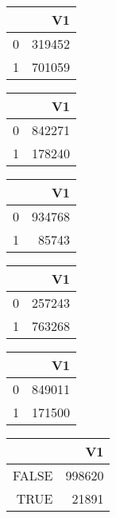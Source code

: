 \bigskip\bigskip
\centering
\begin{tabular}{rr}
  \hline
 & V1 \\ 
  \hline
0 & 319452 \\ 
  1 & 701059 \\ 
   \hline
\end{tabular}

\bigskip\bigskip
\centering
\begin{tabular}{rr}
  \hline
 & V1 \\ 
  \hline
0 & 842271 \\ 
  1 & 178240 \\ 
   \hline
\end{tabular}

\bigskip\bigskip
\centering
\begin{tabular}{rr}
  \hline
 & V1 \\ 
  \hline
0 & 934768 \\ 
  1 & 85743 \\ 
   \hline
\end{tabular}

\bigskip\bigskip
\centering
\begin{tabular}{rr}
  \hline
 & V1 \\ 
  \hline
0 & 257243 \\ 
  1 & 763268 \\ 
   \hline
\end{tabular}

\bigskip\bigskip
\centering
\begin{tabular}{rr}
  \hline
 & V1 \\ 
  \hline
0 & 849011 \\ 
  1 & 171500 \\ 
   \hline
\end{tabular}

\bigskip\bigskip
\centering
\begin{tabular}{rr}
  \hline
 & V1 \\ 
  \hline
FALSE & 998620 \\ 
  TRUE & 21891 \\ 
   \hline
\end{tabular}

